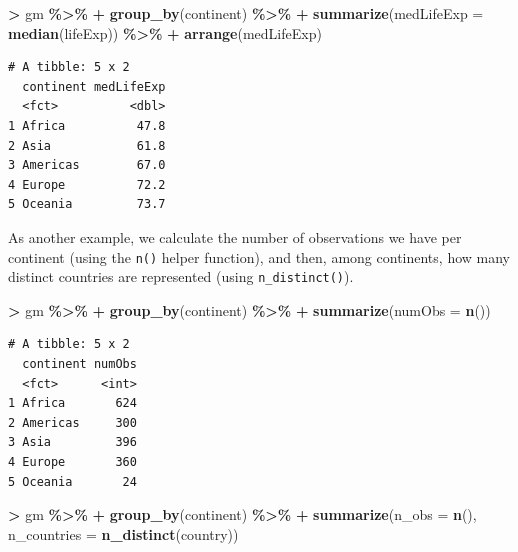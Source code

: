 \documentclass[
]{krantz}
\makeatletter
\newenvironment{Shaded}{\begin{snugshade}}{\end{snugshade}}
\newcommand{\DataTypeTok}[1]{\textcolor[rgb]{0.27,0.27,0.27}{#1}}
\newcommand{\KeywordTok}[1]{\textcolor[rgb]{0.27,0.27,0.27}{\textbf{#1}}}
\newcommand{\NormalTok}[1]{#1}
\newcommand{\OperatorTok}[1]{\textcolor[rgb]{0.43,0.43,0.43}{\textbf{#1}}}
\newcommand{\StringTok}[1]{\textcolor[rgb]{0.5,0.5,0.5}{#1}}
\newenvironment{kframe}{%
\medskip{}
\setlength{\fboxsep}{.8em}
 \def\at@end@of@kframe{}%
 \ifinner\ifhmode%
  \def\at@end@of@kframe{\end{minipage}}%
  \begin{minipage}{\columnwidth}%
 \fi\fi%
 \def\FrameCommand##1{\hskip\@totalleftmargin \hskip-\fboxsep
 \colorbox{shadecolor}{##1}\hskip-\fboxsep
     \hskip-\linewidth \hskip-\@totalleftmargin \hskip\columnwidth}%
 \MakeFramed {\advance\hsize-\width
   \@totalleftmargin\z@ \linewidth\hsize
   \@setminipage}}%
 {\par\unskip\endMakeFramed%
 \at@end@of@kframe}
\renewenvironment{Shaded}{\begin{kframe}}{\end{kframe}}
\makeatother
\begin{document}
\begin{Shaded}
\begin{Highlighting}[]
\OperatorTok{\textgreater{}}\StringTok{ }\NormalTok{gm }\OperatorTok{\%\textgreater{}\%}\StringTok{ }
\OperatorTok{+}\StringTok{   }\KeywordTok{group\_by}\NormalTok{(continent) }\OperatorTok{\%\textgreater{}\%}\StringTok{ }
\OperatorTok{+}\StringTok{   }\KeywordTok{summarize}\NormalTok{(}\DataTypeTok{medLifeExp =} \KeywordTok{median}\NormalTok{(lifeExp)) }\OperatorTok{\%\textgreater{}\%}\StringTok{ }
\OperatorTok{+}\StringTok{   }\KeywordTok{arrange}\NormalTok{(medLifeExp)}
\end{Highlighting}
\end{Shaded}

\begin{verbatim}
# A tibble: 5 x 2
  continent medLifeExp
  <fct>          <dbl>
1 Africa          47.8
2 Asia            61.8
3 Americas        67.0
4 Europe          72.2
5 Oceania         73.7
\end{verbatim}

As another example, we calculate the number of observations we have per continent (using the \texttt{n()} helper function), and then, among continents, how many distinct countries are represented (using \texttt{n\_distinct()}).

\begin{Shaded}
\begin{Highlighting}[]
\OperatorTok{\textgreater{}}\StringTok{ }\NormalTok{gm }\OperatorTok{\%\textgreater{}\%}\StringTok{ }
\OperatorTok{+}\StringTok{   }\KeywordTok{group\_by}\NormalTok{(continent) }\OperatorTok{\%\textgreater{}\%}\StringTok{ }
\OperatorTok{+}\StringTok{   }\KeywordTok{summarize}\NormalTok{(}\DataTypeTok{numObs =} \KeywordTok{n}\NormalTok{())}
\end{Highlighting}
\end{Shaded}

\begin{verbatim}
# A tibble: 5 x 2
  continent numObs
  <fct>      <int>
1 Africa       624
2 Americas     300
3 Asia         396
4 Europe       360
5 Oceania       24
\end{verbatim}

\begin{Shaded}
\begin{Highlighting}[]
\OperatorTok{\textgreater{}}\StringTok{ }\NormalTok{gm }\OperatorTok{\%\textgreater{}\%}
\OperatorTok{+}\StringTok{   }\KeywordTok{group\_by}\NormalTok{(continent) }\OperatorTok{\%\textgreater{}\%}
\OperatorTok{+}\StringTok{   }\KeywordTok{summarize}\NormalTok{(}\DataTypeTok{n\_obs =} \KeywordTok{n}\NormalTok{(), }\DataTypeTok{n\_countries =} \KeywordTok{n\_distinct}\NormalTok{(country))}
\end{Highlighting}
\end{Shaded}
\end{document}
